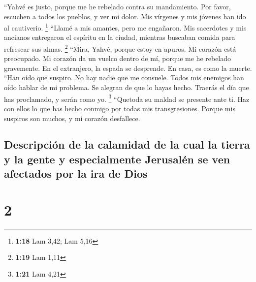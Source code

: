  ``Yahvé es justo, porque me he rebelado contra su
mandamiento. Por favor, escuchen a todos los pueblos, y ver mi dolor.
Mis vírgenes y mis jóvenes han ido al cautiverio. \footnote{\textbf{1:18}
  Lam 3,42; Lam 5,16}  ``Llamé a mis amantes, pero me
engañaron. Mis sacerdotes y mis ancianos entregaron el espíritu en la
ciudad, mientras buscaban comida para refrescar sus almas. \footnote{\textbf{1:19}
  Lam 1,11}  ``Mira, Yahvé, porque estoy en apuros. Mi
corazón está preocupado. Mi corazón da un vuelco dentro de mí, porque me
he rebelado gravemente. En el extranjero, la espada se desprende. En
casa, es como la muerte.  ``Han oído que suspiro. No hay
nadie que me consuele. Todos mis enemigos han oído hablar de mi
problema. Se alegran de que lo hayas hecho. Traerás el día que has
proclamado, y serán como yo. \footnote{\textbf{1:21} Lam 4,21}
 ``Quetoda su maldad se presente ante ti. Haz con ellos
lo que has hecho conmigo por todas mis transgresiones. Porque mis
suspiros son muchos, y mi corazón desfallece.

\hypertarget{descripciuxf3n-de-la-calamidad-de-la-cual-la-tierra-y-la-gente-y-especialmente-jerusaluxe9n-se-ven-afectados-por-la-ira-de-dios}{%
\subsection{Descripción de la calamidad de la cual la tierra y la gente
y especialmente Jerusalén se ven afectados por la ira de
Dios}\label{descripciuxf3n-de-la-calamidad-de-la-cual-la-tierra-y-la-gente-y-especialmente-jerusaluxe9n-se-ven-afectados-por-la-ira-de-dios}}

\hypertarget{section-1}{%
\section{2}\label{section-1}}

